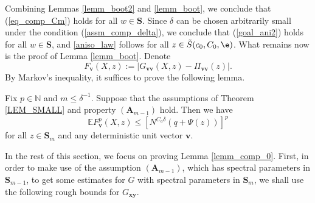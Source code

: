 Combining Lemmas \ref{lemm_boot2} and \ref{lemm_boot}, we conclude that (\ref{eq_comp_Cm}) holds for all $w\in\mathbf S$. Since $\delta$ can be chosen arbitrarily small under the condition (\ref{assm_comp_delta}), we conclude that (\ref{goal_ani2}) holds for all $w\in\mathbf S$, and \eqref{aniso_law} follows for all $z\in \tilde S(c_0,C_0,\e)$. What remains now is the proof of Lemma \ref{lemm_boot}. Denote
\begin{equation}\label{eq_comp_F(X)}
 F_{\mathbf v}(X,z):=\left|G_{\mathbf{vv}}(X,z)-\Pi_{\mathbf {vv}}(z)\right|.
\end{equation}
By Markov's inequality, it suffices to prove the following lemma.
\begin{lemma}\label{lemm_comp_0}
 Fix $p\in \mathbb N$ and $m\le \delta^{-1}$. Suppose that the assumptions of Theorem \ref{LEM_SMALL} and property $(\mathbf A_{m-1})$ hold. Then we have
 \begin{equation}
  \mathbb EF_{\mathbf v}^p(X,z)\le\left[ N^{C_a\delta}\left(q+\Psi(z)\right)\right]^p
 \end{equation}
 for all $z\in{\mathbf S}_m$ and any deterministic unit vector $\mathbf v$.
\end{lemma}
In the rest of this section, we focus on proving Lemma \ref{lemm_comp_0}. 
First, in order to make use of the assumption $(\mathbf A_{m-1})$, which has spectral parameters in $\mathbf S_{m-1}$, to get some estimates for $G$ with spectral parameters in $\mathbf S_{m}$, we shall use the following rough bounds for $ G_{\mathbf{xy}}$.

